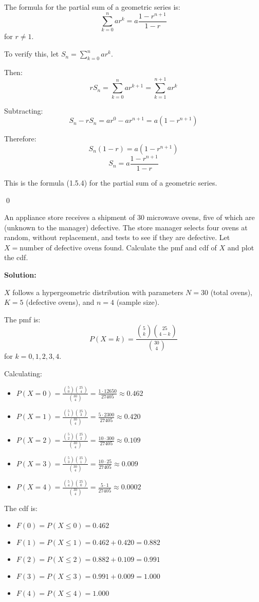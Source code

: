 The formula for the partial sum of a geometric series is:
\[ \sum_{k=0}^{n} ar^k = a \frac{1 - r^{n+1}}{1 - r} \]
for $r \neq 1$.

To verify this, let $S_n = \sum_{k=0}^{n} ar^k$.

Then:
\[ rS_n = \sum_{k=0}^{n} ar^{k+1} = \sum_{k=1}^{n+1} ar^k \]

Subtracting:
\[ S_n - rS_n = ar^0 - ar^{n+1} = a(1 - r^{n+1}) \]

Therefore:
\[ S_n(1 - r) = a(1 - r^{n+1}) \]
\[ S_n = a \frac{1 - r^{n+1}}{1 - r} \]

This is the formula (1.5.4) for the partial sum of a geometric series.



\qed
\begin{problembox}
An appliance store receives a shipment of 30 microwave ovens, five of which are (unknown to the manager) defective. The store manager selects four ovens at random, without replacement, and tests to see if they are defective. Let $X=\text{number of defective ovens found}$. Calculate the pmf and cdf of $X$ and plot the cdf.
\end{problembox}

\noindent\textbf{Solution:}

$X$ follows a hypergeometric distribution with parameters $N = 30$ (total ovens), $K = 5$ (defective ovens), and $n = 4$ (sample size).

The pmf is:
\[ P(X = k) = \frac{\binom{5}{k} \binom{25}{4-k}}{\binom{30}{4}} \]
for $k = 0, 1, 2, 3, 4$.

Calculating:
\begin{itemize}
\item $P(X = 0) = \frac{\binom{5}{0} \binom{25}{4}}{\binom{30}{4}} = \frac{1 \cdot 12650}{27405} \approx 0.462$
\item $P(X = 1) = \frac{\binom{5}{1} \binom{25}{3}}{\binom{30}{4}} = \frac{5 \cdot 2300}{27405} \approx 0.420$
\item $P(X = 2) = \frac{\binom{5}{2} \binom{25}{2}}{\binom{30}{4}} = \frac{10 \cdot 300}{27405} \approx 0.109$
\item $P(X = 3) = \frac{\binom{5}{3} \binom{25}{1}}{\binom{30}{4}} = \frac{10 \cdot 25}{27405} \approx 0.009$
\item $P(X = 4) = \frac{\binom{5}{4} \binom{25}{0}}{\binom{30}{4}} = \frac{5 \cdot 1}{27405} \approx 0.0002$
\end{itemize}

The cdf is:
\begin{itemize}
\item $F(0) = P(X \leq 0) = 0.462$
\item $F(1) = P(X \leq 1) = 0.462 + 0.420 = 0.882$
\item $F(2) = P(X \leq 2) = 0.882 + 0.109 = 0.991$
\item $F(3) = P(X \leq 3) = 0.991 + 0.009 = 1.000$
\item $F(4) = P(X \leq 4) = 1.000$
\end{itemize}

